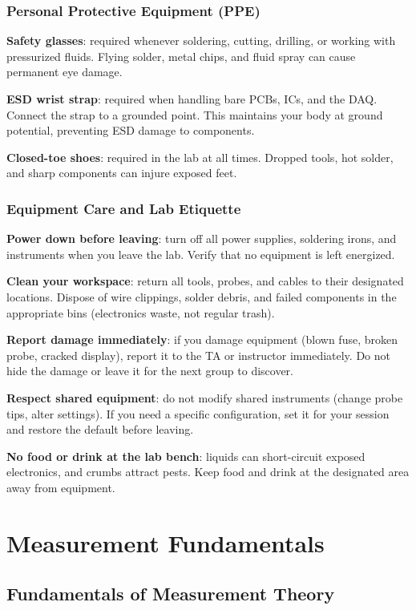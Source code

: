 \documentclass[11pt,letterpaper,twoside,openany]{book}
\begin{document}
\section*{Personal Protective Equipment (PPE)}
\textbf{Safety glasses}: required whenever soldering, cutting, drilling, or working with pressurized fluids. Flying solder, metal chips, and fluid spray can cause permanent eye damage.

\textbf{ESD wrist strap}: required when handling bare PCBs, ICs, and the DAQ. Connect the strap to a grounded point. This maintains your body at ground potential, preventing ESD damage to components.

\textbf{Closed-toe shoes}: required in the lab at all times. Dropped tools, hot solder, and sharp components can injure exposed feet.

\section*{Equipment Care and Lab Etiquette}
\textbf{Power down before leaving}: turn off all power supplies, soldering irons, and instruments when you leave the lab. Verify that no equipment is left energized.

\textbf{Clean your workspace}: return all tools, probes, and cables to their designated locations. Dispose of wire clippings, solder debris, and failed components in the appropriate bins (electronics waste, not regular trash).

\textbf{Report damage immediately}: if you damage equipment (blown fuse, broken probe, cracked display), report it to the TA or instructor immediately. Do not hide the damage or leave it for the next group to discover.

\textbf{Respect shared equipment}: do not modify shared instruments (change probe tips, alter settings). If you need a specific configuration, set it for your session and restore the default before leaving.

\textbf{No food or drink at the lab bench}: liquids can short-circuit exposed electronics, and crumbs attract pests. Keep food and drink at the designated area away from equipment.
\part{Measurement Fundamentals}

\chapter{Fundamentals of Measurement Theory}
\label{ch:measurement_theory}
\end{document}
